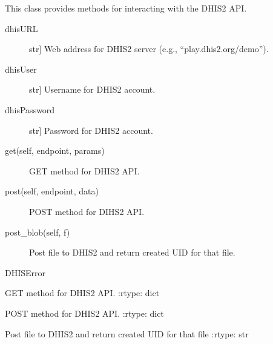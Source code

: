 \documentclass[letterpaper,12pt,english]{sphinxmanual}
\begin{document}

\begin{fulllineitems}
\label{\detokenize{help:dhis.API}}
This class provides methods for interacting with the DHIS2 API.
\begin{description}
\item[{dhisURL}] \leavevmode{[}str{]}
Web address for DHIS2 server (e.g., “play.dhis2.org/demo”).

\item[{dhisUser}] \leavevmode{[}str{]}
Username for DHIS2 account.

\item[{dhisPassword}] \leavevmode{[}str{]}
Password for DHIS2 account.

\end{description}
\begin{description}
\item[{get(self, endpoint, params)}] \leavevmode
GET method for DHIS2 API.

\item[{post(self, endpoint, data) }] \leavevmode
POST method for DIHS2 API.

\item[{post\_blob(self, f) }] \leavevmode
Post file to DHIS2 and return created UID for that file.

\end{description}

DHISError

\begin{fulllineitems}
\label{\detokenize{help:dhis.API.get}}
GET method for DHIS2 API.
:rtype: dict

\end{fulllineitems}


\begin{fulllineitems}
\label{\detokenize{help:dhis.API.post}}
POST  method for DHIS2 API.
:rtype: dict

\end{fulllineitems}


\begin{fulllineitems}
\label{\detokenize{help:dhis.API.post_blob}}
Post file to DHIS2 and return created UID for that file
:rtype: str

\end{fulllineitems}


\end{fulllineitems}
\end{document}
